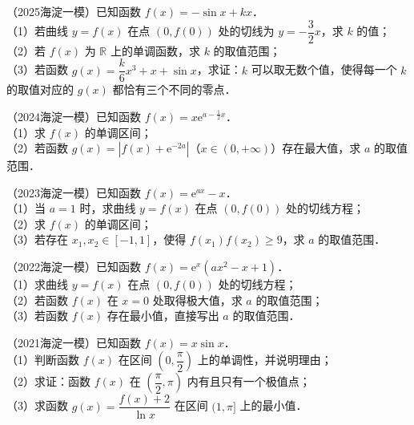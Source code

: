 \begin{example}
（2025海淀一模）已知函数 $f(x)=-\sin x+kx$．\\
（1）若曲线 $y=f(x)$ 在点 $(0,f(0))$ 处的切线为 $y=-\dfrac32x$，求 $k$ 的值；\\
（2）若 $f(x)$ 为 $\mathbb{R}$ 上的单调函数，求 $k$ 的取值范围；\\
（3）若函数 $g(x)=\dfrac{k}{6}x^3+x+\sin x$，求证：$k$ 可以取无数个值，使得每一个 $k$ 的取值对应的 $g(x)$ 都恰有三个不同的零点．
\end{example}

\begin{example}
（2024海淀一模）已知函数 $f(x)=x\mathrm{e}^{a-\frac12x}$．\\
（1）求 $f(x)$ 的单调区间；\\
（2）若函数 $g(x)=\left|f(x)+\mathrm{e}^{-2a}\right|$（$x\in(0,+\infty)$）存在最大值，求 $a$ 的取值范围．
\end{example}

\begin{example}
（2023海淀一模）已知函数 $f(x)=\mathrm{e}^{ax}-x$．\\
（1）当 $a=1$ 时，求曲线 $y=f(x)$ 在点 $(0,f(0))$ 处的切线方程；\\
（2）求 $f(x)$ 的单调区间；\\
（3）若存在 $x_1,x_2\in[-1,1]$，使得 $f(x_1)f(x_2)\geqslant9$，求 $a$ 的取值范围．
\end{example}

\begin{example}
（2022海淀一模）已知函数 $f(x)=\mathrm{e}^x(ax^2-x+1)$．\\
（1）求曲线 $y=f(x)$ 在点 $(0,f(0))$ 处的切线方程；\\
（2）若函数 $f(x)$ 在 $x=0$ 处取得极大值，求 $a$ 的取值范围；\\
（3）若函数 $f(x)$ 存在最小值，直接写出 $a$ 的取值范围．
\end{example}

\begin{example}
（2021海淀一模）已知函数 $f(x)=x\sin x$．\\
（1）判断函数 $f(x)$ 在区间 $\left(0,\dfrac\pi2\right)$ 上的单调性，并说明理由；\\
（2）求证：函数 $f(x)$ 在 $\left(\dfrac\pi2,\pi\right)$ 内有且只有一个极值点；\\
（3）求函数 $g(x)=\dfrac{f(x)+2}{\ln x}$ 在区间 $(1,\pi]$ 上的最小值．
\end{example}
